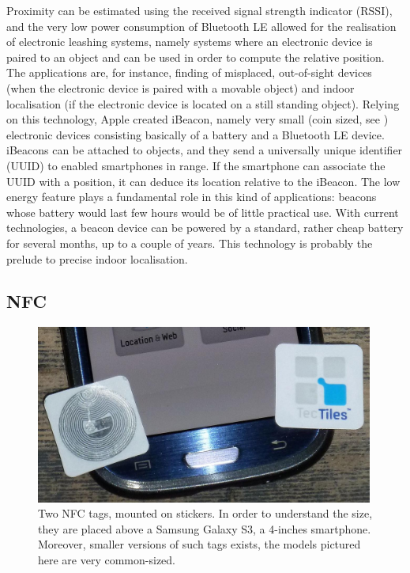 \documentclass[12pt,a4paper,twoside,openright]{book}
\begin{document}
Proximity can be estimated using the received signal strength indicator (RSSI), and the very low power consumption of Bluetooth LE allowed for the realisation of electronic leashing systems, namely systems where an electronic device is paired to an object and can be used in order to compute the relative position.
%
The applications are, for instance, finding of misplaced, out-of-sight devices (when the electronic device is paired with a movable object) and indoor localisation (if the electronic device is located on a still standing object).
%
Relying on this technology, Apple created iBeacon, namely very small (coin sized, see ) electronic devices consisting basically of a battery and a Bluetooth LE device.
%
iBeacons can be attached to objects, and they send a universally unique identifier (UUID) to enabled smartphones in range.
%
If the smartphone can associate the UUID with a position, it can deduce its location relative to the iBeacon.
%
The low energy feature plays a fundamental role in this kind of applications: beacons whose battery would last few hours would be of little practical use.
%
With current technologies, a beacon device can be powered by a standard, rather cheap battery for several months, up to a couple of years.
%
This technology is probably the prelude to precise indoor localisation. 

\subsection{NFC}

\begin{figure}
	\centering
	\includegraphics[width=0.99\textwidth]{img/nfc-tag}
	\caption[NFC tags]{
		Two NFC tags, mounted on stickers.
		In order to understand the size, they are placed above a Samsung Galaxy S3, a 4-inches smartphone.
		Moreover, smaller versions of such tags exists, the models pictured here are very common-sized.
	}
	\label{img:nfc-tag}
\end{figure}
\end{document}
